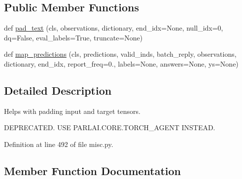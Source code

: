 \subsection*{Public Member Functions}
\begin{DoxyCompactItemize}
\item 
def \hyperlink{classparlai_1_1utils_1_1misc_1_1PaddingUtils_acd7178452139c55dc56e9889b10347cc}{pad\+\_\+text} (cls, observations, dictionary, end\+\_\+idx=None, null\+\_\+idx=0, dq=False, eval\+\_\+labels=True, truncate=None)
\item 
def \hyperlink{classparlai_1_1utils_1_1misc_1_1PaddingUtils_ae862960e8f261ff4088d5dedbe42a25c}{map\+\_\+predictions} (cls, predictions, valid\+\_\+inds, batch\+\_\+reply, observations, dictionary, end\+\_\+idx, report\+\_\+freq=0., labels=None, answers=None, ys=None)
\end{DoxyCompactItemize}


\subsection{Detailed Description}
\begin{DoxyVerb}Helps with padding input and target tensors.

DEPRECATED. USE PARLAI.CORE.TORCH_AGENT INSTEAD.
\end{DoxyVerb}
 

Definition at line 492 of file misc.\+py.



\subsection{Member Function Documentation}
\mbox{\label{classparlai_1_1utils_1_1misc_1_1PaddingUtils_ae862960e8f261ff4088d5dedbe42a25c}} 
